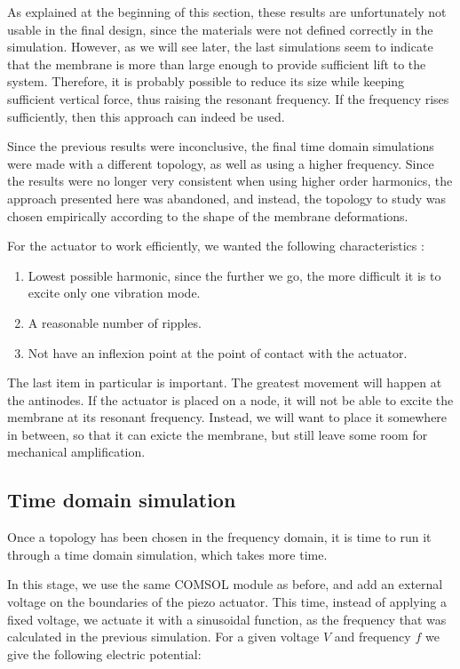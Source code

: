 As explained at the beginning of this section, these results are unfortunately
not usable in the final design, since the materials were not defined correctly
in the simulation. However, as we will see later, the last simulations seem to
indicate that the membrane is more than large enough to provide sufficient lift
to the system. Therefore, it is probably possible to reduce its size while
keeping sufficient vertical force, thus raising the resonant frequency. If the
frequency rises sufficiently, then this approach can indeed be used.

Since the previous results were inconclusive, the final time domain simulations
were made with a different topology, as well as using a higher frequency. Since
the results were no longer very consistent when using higher order harmonics,
the approach presented here was abandoned, and instead, the topology to study
was chosen empirically according to the shape of the membrane deformations.

For the actuator to work efficiently, we wanted the following characteristics :
\begin{enumerate}
  \item Lowest possible harmonic, since the further we go, the more difficult it
    is to excite only one vibration mode.
  \item A reasonable number of ripples.
  \item Not have an inflexion point at the point of contact with the actuator.
\end{enumerate}

The last item in particular is important. The greatest movement will happen at
the antinodes. If the actuator is placed on a node, it will not be able to
excite the membrane at its resonant frequency. Instead, we will want to place it
somewhere in between, so that it can exicte the membrane, but still leave some
room for mechanical amplification.

\subsection{Time domain simulation}
\label{sub:time-domain}

Once a topology has been chosen in the frequency domain, it is time to run it
through a time domain simulation, which takes more time.

In this stage, we use the same COMSOL module as before, and add an external
voltage on the boundaries of the piezo actuator. This time, instead of applying
a fixed voltage, we actuate it with a sinusoidal function, as the frequency that
was calculated in the previous simulation. For a given voltage $V$ and frequency
$f$ we give the following electric potential:

